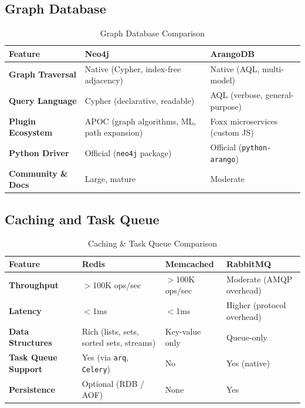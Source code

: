 \subsection{Graph Database}

\begin{table}[H]
    \caption{Graph Database Comparison}
    \centering
    \renewcommand{\arraystretch}{1.3}
    \begin{tabular}{|p{}|p{}|p{}|}
        \hline
        \textbf{Feature} & \textbf{Neo4j} & \textbf{ArangoDB} \\
        \hline
        \textbf{Graph Traversal} & Native (Cypher, index-free adjacency) & Native (AQL, multi-model) \\
        \textbf{Query Language} & Cypher (declarative, readable) & AQL (verbose, general-purpose) \\
        \textbf{Plugin Ecosystem} & APOC (graph algorithms, ML, path expansion) & Foxx microservices (custom JS) \\
        \textbf{Python Driver} & Official (\texttt{neo4j} package) & Official (\texttt{python-arango}) \\
        \textbf{Community \& Docs} & Large, mature & Moderate \\
        \hline
    \end{tabular}
\end{table}

\subsection{Caching and Task Queue}

\begin{table}[H]
    \caption{Caching \& Task Queue Comparison}
    \centering
    \renewcommand{\arraystretch}{1.3}
    \begin{tabular}{|p{}|p{}|p{}|p{}|}
        \hline
        \textbf{Feature} & \textbf{Redis} & \textbf{Memcached} & \textbf{RabbitMQ} \\
        \hline
        \textbf{Throughput} & $>$100K ops/sec \cite{redis2024benchmark} & $>$100K ops/sec & Moderate (AMQP overhead) \\
        \textbf{Latency} & $<$1ms \cite{redis2024benchmark} & $<$1ms & Higher (protocol overhead) \\
        \textbf{Data Structures} & Rich (lists, sets, sorted sets, streams) & Key-value only & Queue-only \\
        \textbf{Task Queue Support} & Yes (via \texttt{arq}, \texttt{Celery}) & No & Yes (native) \\
        \textbf{Persistence} & Optional (RDB / AOF) & None & Yes \\
        \hline
    \end{tabular}
\end{table}

